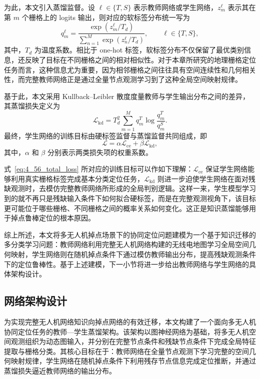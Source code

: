 为此，本文引入蒸馏监督。设 \(\ell\in\{T,S\}\) 表示教师网络或学生网络，\(z_m^{\ell}\) 表示其在第 \(m\) 个栅格上的 logits 输出，则对应的软标签分布统一写为
\begin{equation}
q^{\ell}_{m}
=
\frac{\exp(z^{\ell}_{m}/T_d)}
{\sum_{n=1}^{M}\exp(z^{\ell}_{n}/T_d)},
\qquad \ell\in\{T,S\},
\label{eq:4_53_soft_targets}
\end{equation}
其中，\(T_d\) 为温度系数。相比于 one-hot 标签，软标签分布不仅保留了最优类别信息，还反映了目标在不同栅格之间的相对相似性。对于本章所研究的地理栅格定位任务而言，这种信息尤为重要，因为相邻栅格之间往往具有空间连续性和几何相关性，而完整教师网络正是通过全量节点观测学习到了这种全局空间映射规律。

基于此，本文采用 Kullback--Leibler 散度度量教师与学生输出分布之间的差异，其蒸馏损失定义为
\begin{equation}
\mathcal{L}_{\mathrm{kd}}
=
T_d^2
\sum_{m=1}^{M}
q^{T}_{m}
\log
\frac{q^{T}_{m}}{q^{S}_{m}}.
\label{eq:4_55_kd}
\end{equation}
最终，学生网络的训练目标由硬标签监督与蒸馏监督共同组成，即
\begin{equation}
\mathcal{L}
=
\alpha \mathcal{L}_{\mathrm{ce}}
+
\beta \mathcal{L}_{\mathrm{kd}},
\label{eq:4_56_total_loss}
\end{equation}
其中，\(\alpha\) 和 \(\beta\) 分别表示两类损失项的权重系数。

式~\eqref{eq:4_56_total_loss} 所对应的训练目标可以作如下理解：\(\mathcal{L}_{\mathrm{ce}}\) 保证学生网络能够利用真实栅格标签完成基本分类定位任务，\(\mathcal{L}_{\mathrm{kd}}\) 则进一步迫使学生网络在面对残缺观测时，去模仿完整教师网络所形成的全局判别逻辑。这样一来，学生模型学习到的就不再只是残缺输入条件下如何拟合硬标签，而是在完整观测视角下，该目标更可能位于哪些栅格、不同栅格之间的概率关系如何变化。这正是知识蒸馏能够用于掉点鲁棒定位的根本原因。

综上所述，本文将多无人机掉点场景下的协同定位问题建模为一个基于知识迁移的多分类学习问题：教师网络利用完整无人机网络构建的无线电地图学习全局空间几何映射，学生网络则在随机掉点条件下通过模仿教师输出分布，提高残缺观测条件下的定位鲁棒性。基于上述建模，下一小节将进一步给出教师网络与学生网络的具体架构设计。

\subsection{网络架构设计}
\label{subsec:4_3_3}

为实现完整无人机网络知识向掉点网络的有效迁移，本文构建了一个面向多无人机协同定位任务的教师—学生蒸馏架构。该架构以图神经网络为基础，将多无人机空间观测组织为动态图输入，并分别在完整节点条件和残缺节点条件下完成全局特征提取与栅格分类。其核心目标在于：教师网络在全量节点观测下学习完整的空间几何映射规律，学生网络在随机掉点条件下利用残存节点信息完成定位推断，并通过蒸馏损失逼近教师网络的输出分布。

